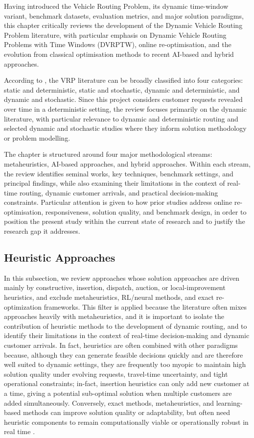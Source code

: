 Having introduced the Vehicle Routing Problem, its dynamic time-window variant, benchmark datasets, evaluation metrics, and major solution paradigms, this chapter critically reviews the development of the Dynamic Vehicle Routing Problem literature, with particular emphasis on Dynamic Vehicle Routing Problems with Time Windows (DVRPTW), online re-optimisation, and the evolution from classical optimisation methods to recent AI-based and hybrid approaches.

According to \cite{ojedariosRecentDynamicVehicle2021}, the VRP literature can be broadly classified into four categories: static and deterministic, static and stochastic, dynamic and deterministic, and dynamic and stochastic. Since this project considers customer requests revealed over time in a deterministic setting, the review focuses primarily on the dynamic literature, with particular relevance to dynamic and deterministic routing and selected dynamic and stochastic studies where they inform solution methodology or problem modelling.

The chapter is structured around four major methodological streams: metaheuristics, AI-based approaches, and hybrid approaches. 
Within each stream, the review identifies seminal works, key techniques, benchmark settings, and principal findings, 
while also examining their limitations in the context of real-time routing, dynamic customer arrivals, 
and practical decision-making constraints. Particular attention is given to how prior studies 
address online re-optimisation, responsiveness, solution quality, and benchmark design, in order
 to position the present study within the current state of research and to justify the research 
 gap it addresses.

\subsection{Heuristic Approaches}
In this subsection, we review approaches whose solution approaches are driven mainly by constructive,
insertion, dispatch, auction, or local-improvement heuristics, and exclude metaheuristics,
RL/neural methods, and exact re-optimization frameworks. This filter is applied because the
literature often mixes approaches heavily with metaheuristics, and it is important to isolate
the contribution of heuristic methods to the development of dynamic routing, and to identify their
limitations in the context of real-time decision-making and dynamic customer arrivals. In fact,
heuristics are often combined with other paradigms because, although they can generate feasible
decisions quickly and are therefore well suited to dynamic settings, they are frequently too myopic
to maintain high solution quality under evolving requests, travel-time uncertainty, and tight
operational constraints; in-fact, insertion heuristics can only add new customer at a time, giving a potential
sub-optimal solution when multiple customers are added simultaneously. Conversely, exact methods, 
metaheuristics, and learning-based methods can improve solution quality or adaptability, 
but often need heuristic components to remain computationally viable or operationally robust in 
real time \cite{jungDuallySustainableUrban2017,ozbayginIterativeReoptimizationFramework2019}.

